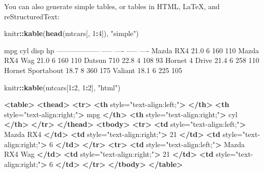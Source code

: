 \documentclass[
  11pt,
]{krantz}
\newenvironment{Shaded}{\begin{snugshade}}{\end{snugshade}}
\newcommand{\BaseNTok}[1]{\textcolor[rgb]{0.06,0.06,0.06}{#1}}
\newcommand{\DecValTok}[1]{\textcolor[rgb]{0.06,0.06,0.06}{#1}}
\newcommand{\KeywordTok}[1]{\textcolor[rgb]{0.27,0.27,0.27}{\textbf{#1}}}
\newcommand{\NormalTok}[1]{#1}
\newcommand{\OperatorTok}[1]{\textcolor[rgb]{0.43,0.43,0.43}{\textbf{#1}}}
\newcommand{\OtherTok}[1]{\textcolor[rgb]{0.37,0.37,0.37}{#1}}
\newcommand{\StringTok}[1]{\textcolor[rgb]{0.5,0.5,0.5}{#1}}
\begin{document}
You can also generate simple tables, or tables in HTML, LaTeX, and reStructuredText:

\begin{Shaded}
\begin{Highlighting}[]
\NormalTok{knitr}\OperatorTok{::}\KeywordTok{kable}\NormalTok{(}\KeywordTok{head}\NormalTok{(mtcars[, }\DecValTok{1}\OperatorTok{:}\DecValTok{4}\NormalTok{]), }\StringTok{"simple"}\NormalTok{)}
\end{Highlighting}
\end{Shaded}

\begin{Shaded}
\begin{Highlighting}[]
\BaseNTok{                      mpg   cyl   disp    hp}
\NormalTok{------------------  -----  ----  -----  ----}
\NormalTok{Mazda RX4            21.0     6    160   110}
\NormalTok{Mazda RX4 Wag        21.0     6    160   110}
\NormalTok{Datsun 710           22.8     4    108    93}
\NormalTok{Hornet 4 Drive       21.4     6    258   110}
\NormalTok{Hornet Sportabout    18.7     8    360   175}
\NormalTok{Valiant              18.1     6    225   105}
\end{Highlighting}
\end{Shaded}

\begin{Shaded}
\begin{Highlighting}[]
\NormalTok{knitr}\OperatorTok{::}\KeywordTok{kable}\NormalTok{(mtcars[}\DecValTok{1}\OperatorTok{:}\DecValTok{2}\NormalTok{, }\DecValTok{1}\OperatorTok{:}\DecValTok{2}\NormalTok{], }\StringTok{"html"}\NormalTok{)}
\end{Highlighting}
\end{Shaded}

\begin{Shaded}
\begin{Highlighting}[]
\KeywordTok{<table>}
 \KeywordTok{<thead>}
  \KeywordTok{<tr>}
   \KeywordTok{<th}\OtherTok{ style=}\StringTok{"text-align:left;"}\KeywordTok{>}   \KeywordTok{</th>}
   \KeywordTok{<th}\OtherTok{ style=}\StringTok{"text-align:right;"}\KeywordTok{>}\NormalTok{ mpg }\KeywordTok{</th>}
   \KeywordTok{<th}\OtherTok{ style=}\StringTok{"text-align:right;"}\KeywordTok{>}\NormalTok{ cyl }\KeywordTok{</th>}
  \KeywordTok{</tr>}
 \KeywordTok{</thead>}
\KeywordTok{<tbody>}
  \KeywordTok{<tr>}
   \KeywordTok{<td}\OtherTok{ style=}\StringTok{"text-align:left;"}\KeywordTok{>}\NormalTok{ Mazda RX4 }\KeywordTok{</td>}
   \KeywordTok{<td}\OtherTok{ style=}\StringTok{"text-align:right;"}\KeywordTok{>}\NormalTok{ 21 }\KeywordTok{</td>}
   \KeywordTok{<td}\OtherTok{ style=}\StringTok{"text-align:right;"}\KeywordTok{>}\NormalTok{ 6 }\KeywordTok{</td>}
  \KeywordTok{</tr>}
  \KeywordTok{<tr>}
   \KeywordTok{<td}\OtherTok{ style=}\StringTok{"text-align:left;"}\KeywordTok{>}\NormalTok{ Mazda RX4 Wag }\KeywordTok{</td>}
   \KeywordTok{<td}\OtherTok{ style=}\StringTok{"text-align:right;"}\KeywordTok{>}\NormalTok{ 21 }\KeywordTok{</td>}
   \KeywordTok{<td}\OtherTok{ style=}\StringTok{"text-align:right;"}\KeywordTok{>}\NormalTok{ 6 }\KeywordTok{</td>}
  \KeywordTok{</tr>}
\KeywordTok{</tbody>}
\KeywordTok{</table>}
\end{Highlighting}
\end{Shaded}
\end{document}
